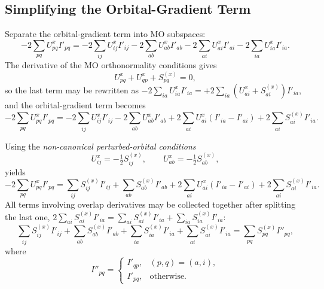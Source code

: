 \documentclass[12pt]{article}
\begin{document}
\subsection{Simplifying the Orbital-Gradient Term}
\label{sec:orbgrad}

Separate the orbital-gradient term into MO subspaces:
\begin{equation}
-2\sum_{pq} U^x_{pq} I'_{pq}
= -2\sum_{ij} U^x_{ij} I'_{ij}
- 2\sum_{ab} U^x_{ab} I'_{ab}
- 2\sum_{ai} U^x_{ai} I'_{ai}
- 2\sum_{ia} U^x_{ia} I'_{ia}.
\end{equation}
The derivative of the MO orthonormality conditions gives
\begin{equation}
U^x_{pq} + U^x_{qp} + S^{(x)}_{pq} = 0,
\label{eq:ortho}
\end{equation}
so the last term may be rewritten as
$-2\sum_{ia}U^x_{ia}I'_{ia} = +2\sum_{ia}\left(U^x_{ai}+S^{(x)}_{ai}\right)I'_{ia}$,
and the orbital-gradient term becomes
\begin{equation}
-2\sum_{pq} U^x_{pq} I'_{pq}
= -2\sum_{ij} U^x_{ij} I'_{ij}
- 2\sum_{ab} U^x_{ab} I'_{ab}
+ 2\sum_{ai} U^x_{ai}\left(I'_{ia}-I'_{ai}\right)
+ 2\sum_{ai} S^{(x)}_{ai} I'_{ia}.
\label{eq:orbgrad}
\end{equation}

\noindent
Using the {\em non-canonical perturbed-orbital
conditions}\cite{Handy85:MP2Hessians}
\begin{equation}
U^x_{ij} = -\tfrac{1}{2}S^{(x)}_{ij}, \qquad U^x_{ab} = -\tfrac{1}{2}S^{(x)}_{ab},
\label{eq:noncanon}
\end{equation}
yields
\begin{equation}
-2\sum_{pq} U^x_{pq} I'_{pq}
= \sum_{ij} S^{(x)}_{ij} I'_{ij}
+ \sum_{ab} S^{(x)}_{ab} I'_{ab}
+ 2\sum_{ai} U^x_{ai}\left(I'_{ia}-I'_{ai}\right)
+ 2\sum_{ai} S^{(x)}_{ai} I'_{ia}.
\end{equation}
All terms involving overlap derivatives may be collected together after
splitting the last one, $2\sum_{ai}S^{(x)}_{ai}I'_{ia} = \sum_{ai}S^{(x)}_{ai}I'_{ia}
+ \sum_{ia}S^{(x)}_{ia}I'_{ia}$:
\begin{equation}
\sum_{ij} S^{(x)}_{ij} I'_{ij}
+ \sum_{ab} S^{(x)}_{ab} I'_{ab}
+ \sum_{ia} S^{(x)}_{ia} I'_{ia}
+ \sum_{ai} S^{(x)}_{ai} I'_{ia}
= \sum_{pq} S^{(x)}_{pq} I''_{pq},
\end{equation}
where
\begin{equation}
I''_{pq} =
\begin{cases}
I'_{qp}, & (p,q)=(a,i),\\
I'_{pq}, & \text{otherwise.}
\end{cases}
\label{eq:Idouble}
\end{equation}
\end{document}
